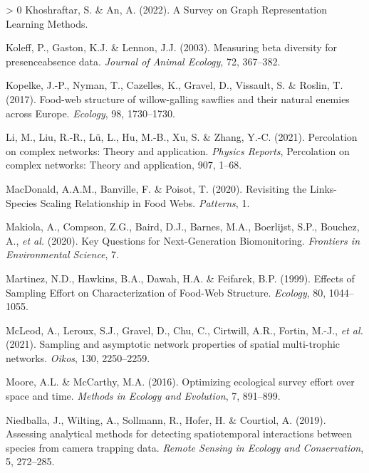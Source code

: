 \documentclass[10pt,oneside]{article}
\newlength{\cslhangindent}
\newenvironment{CSLReferences}[3] %
 {%
  \setlength{\parindent}{0pt}
  \ifodd #1 \everypar{\setlength{\hangindent}{\cslhangindent}}\ignorespaces\fi
  \ifnum #2 > 0
  \setlength{\parskip}{#2\baselineskip}
  \fi
 }%
 {}
\begin{document}
\begin{CSLReferences}{1}{0}
\leavevmode\hypertarget{ref-Khoshraftar2022SurGra}{}%
Khoshraftar, S. \& An, A. (2022). A Survey on Graph Representation
Learning Methods.

\leavevmode\hypertarget{ref-Koleff2003MeaBet}{}%
Koleff, P., Gaston, K.J. \& Lennon, J.J. (2003). Measuring beta
diversity for presenceabsence data. \emph{Journal of Animal Ecology},
72, 367--382.

\leavevmode\hypertarget{ref-Kopelke2017FooStr}{}%
Kopelke, J.-P., Nyman, T., Cazelles, K., Gravel, D., Vissault, S. \&
Roslin, T. (2017). Food-web structure of willow-galling sawflies and
their natural enemies across Europe. \emph{Ecology}, 98, 1730--1730.

\leavevmode\hypertarget{ref-Li2021PerCom}{}%
Li, M., Liu, R.-R., Lü, L., Hu, M.-B., Xu, S. \& Zhang, Y.-C. (2021).
Percolation on complex networks: Theory and application. \emph{Physics
Reports}, Percolation on complex networks: Theory and application, 907,
1--68.

\leavevmode\hypertarget{ref-MacDonald2020RevLin}{}%
MacDonald, A.A.M., Banville, F. \& Poisot, T. (2020). Revisiting the
Links-Species Scaling Relationship in Food Webs. \emph{Patterns}, 1.

\leavevmode\hypertarget{ref-Makiola2020KeyQue}{}%
Makiola, A., Compson, Z.G., Baird, D.J., Barnes, M.A., Boerlijst, S.P.,
Bouchez, A., \emph{et al.} (2020). Key Questions for Next-Generation
Biomonitoring. \emph{Frontiers in Environmental Science}, 7.

\leavevmode\hypertarget{ref-Martinez1999EffSam}{}%
Martinez, N.D., Hawkins, B.A., Dawah, H.A. \& Feifarek, B.P. (1999).
Effects of Sampling Effort on Characterization of Food-Web Structure.
\emph{Ecology}, 80, 1044--1055.

\leavevmode\hypertarget{ref-McLeod2021SamAsy}{}%
McLeod, A., Leroux, S.J., Gravel, D., Chu, C., Cirtwill, A.R., Fortin,
M.-J., \emph{et al.} (2021). Sampling and asymptotic network properties
of spatial multi-trophic networks. \emph{Oikos}, 130, 2250--2259.

\leavevmode\hypertarget{ref-Moore2016OptEco}{}%
Moore, A.L. \& McCarthy, M.A. (2016). Optimizing ecological survey
effort over space and time. \emph{Methods in Ecology and Evolution}, 7,
891--899.

\leavevmode\hypertarget{ref-Niedballa2019AssAna}{}%
Niedballa, J., Wilting, A., Sollmann, R., Hofer, H. \& Courtiol, A.
(2019). Assessing analytical methods for detecting spatiotemporal
interactions between species from camera trapping data. \emph{Remote
Sensing in Ecology and Conservation}, 5, 272--285.


\end{CSLReferences}
\end{document}

